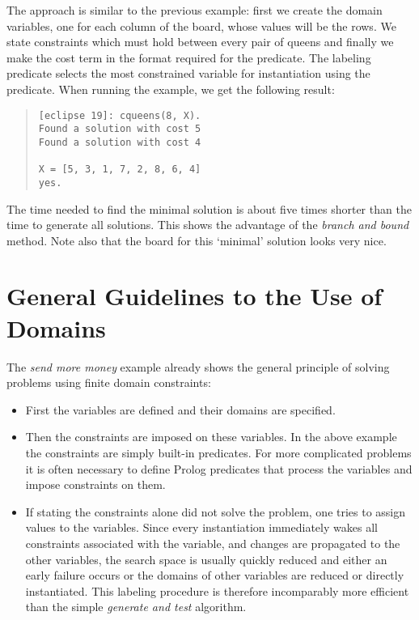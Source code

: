 The approach is similar to the previous example: first we create
the domain variables, one for each column of the board,
whose values will be the rows.
We state constraints which must hold between every pair
of queens and finally
we make the cost term in the format required for the
 predicate.
The labeling predicate selects the most constrained variable
for instantiation using the  predicate.
When running the example, we get the following result:
\begin{quote}
\begin{verbatim}
[eclipse 19]: cqueens(8, X).
Found a solution with cost 5
Found a solution with cost 4

X = [5, 3, 1, 7, 2, 8, 6, 4] 
yes.
\end{verbatim}
\end{quote}
The time needed to find the minimal solution is about five times
shorter than the time to generate all solutions.
This shows the advantage of the {\it branch and bound} method.
Note also that the board for this `minimal' solution looks
very nice.


\section{General Guidelines to the Use of Domains}
The {\it send more money} example already shows the general
principle of solving problems
using finite domain constraints:
\begin{itemize}
\item First the variables are defined and their domains are specified.

\item Then the constraints are imposed on these variables.
In the above example the constraints are simply built-in predicates.
For more complicated problems it is often necessary to define
Prolog predicates that process the variables and impose constraints
on them.

\item If stating the constraints alone did not solve the problem,
one tries to assign values to the variables. Since every
instantiation immediately wakes all constraints associated with the variable,
and changes are propagated to the other variables, the search space
is usually quickly reduced and either an early failure occurs
or the domains of other variables are reduced or directly instantiated.
This labeling procedure is therefore incomparably more efficient
than the simple {\it generate and test} algorithm.
\end{itemize}


